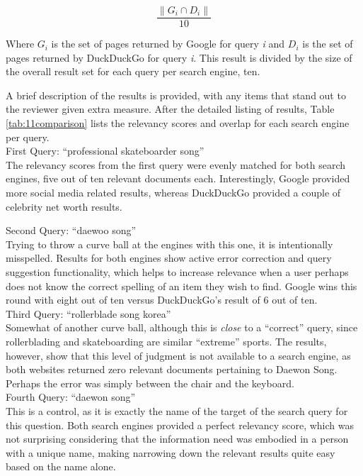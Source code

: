 \[ \frac{\| G_i \cap D_i \|}{ 10 }\]

Where \(G_i\) is the set of pages returned by Google for query \textit{i} and \(D_i\) is the set of pages returned by DuckDuckGo for query \textit{i}.  This result is divided by the size of the overall result set for each query per search engine, ten.

A brief description of the results is provided, with any items that stand out to the reviewer given extra measure.  After the detailed listing of results, Table \ref{tab:11comparison} lists the relevancy scores and overlap for each search engine per query.\\

First Query: ``professional skateboarder song''\\

The relevancy scores from the first query were evenly matched for both search engines, five out of ten relevant documents each.  Interestingly, Google provided more social media related results, whereas DuckDuckGo provided a couple of celebrity net worth results.\\

\clearpage

Second Query: ``daewoo song''\\

Trying to throw a curve ball at the engines with this one, it is intentionally misspelled.  Results for both engines show active error correction and query suggestion functionality, which helps to increase relevance when a user perhaps does not know the correct spelling of an item they wish to find.  Google wins this round with eight out of ten versus DuckDuckGo's result of 6 out of ten.\\


Third Query: ``rollerblade song korea''\\

Somewhat of another curve ball, although this is \textit{close} to a ``correct'' query, since rollerblading and skateboarding are similar ``extreme'' sports.  The results, however, show that this level of judgment is not available to a search engine, as both websites returned zero relevant documents pertaining to Daewon Song.  Perhaps the error was simply between the chair and the keyboard.\\

Fourth Query: ``daewon song''\\

This is a control, as it is exactly the name of the target of the search query for this question.  Both search engines provided a perfect relevancy score, which was not surprising considering that the information need was embodied in a person with a unique name, making narrowing down the relevant results quite easy based on the name alone.


